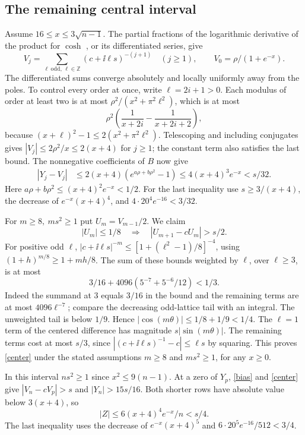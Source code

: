 \subsection{The remaining central interval}
Assume \(16\le x\le3\sqrt{n-1}\). The partial fractions of the logarithmic derivative of the product for \(\cosh\) \cite{dlmf}, or its differentiated series, give
\[
 V_j=\sum_{\ell\ \mathrm{odd},\,\ell\in\mathbb Z}(c+\ii\ell s)^{-(j+1)}
 \quad (j\ge1),\qquad V_0=\rho/(1+e^{-x}).
\]
The differentiated sums converge absolutely and locally uniformly away from the poles. To control every order at once, write \(\ell=2i+1>0\). Each modulus of order at least two is at most \(\rho^2/(x^2+\pi^2\ell^2)\), which is at most
\[
 \rho^2\left(\frac1{x+2i}-\frac1{x+2i+2}\right),
\]
because \((x+\ell)^2-1\le2(x^2+\pi^2\ell^2)\). Telescoping and including conjugates gives \(|V_j|\le2\rho^2/x\le2(x+4)\) for \(j\ge1\); the constant term also satisfies the last bound. The nonnegative coefficients of \(B\) now give
\begin{align}
 |Y_j-V_j|&\le2(x+4)(e^{a\rho+b\rho^2}-1)
 \le4(x+4)^3e^{-x}<s/32.\label{bias}
\end{align}
Here \(a\rho+b\rho^2\le (x+4)^2e^{-x}<1/2\). For the last inequality use \(s\ge3/(x+4)\), the decrease of \(e^{-x}(x+4)^4\), and \(4\cdot20^4e^{-16}<3/32\).

For \(m\ge8,\ ms^2\ge1\) put \(U_m=V_{m-1}/2\). We claim
\begin{equation}\label{center}
 |U_m|\le1/8\quad\Longrightarrow\quad |U_{m+1}-cU_m|>s/2 .
\end{equation}
For positive odd \(\ell\), \(|c+\ii\ell s|^{-m}\le[1+(\ell^2-1)/8]^{-4}\), using \((1+h)^{m/8}\ge1+mh/8\). The sum of these bounds weighted by \(\ell\), over \(\ell\ge3\), is at most
\[
 3/16+4096(5^{-7}+5^{-6}/12)<1/3.
\]
Indeed the summand at 3 equals \(3/16\) in the bound and the remaining terms are at most \(4096\ell^{-7}\); compare the decreasing odd-lattice tail with an integral. The unweighted tail is below \(1/9\). Hence \(|\cos(m\theta)|\le1/8+1/9<1/4\). The \(\ell=1\) term of the centered difference has magnitude \(s|\sin(m\theta)|\). The remaining terms cost at most \(s/3\), since \(|(c+\ii\ell s)^{-1}-c|\le\ell s\) by squaring. This proves \eqref{center} under the stated assumptions \(m\ge8\) and \(ms^2\ge1\), for any \(x\ge0\).

In this interval \(ns^2\ge1\) since \(x^2\le9(n-1)\). At a zero of \(Y_p\), \eqref{bias} and \eqref{center} give \(|V_n-cV_p|>s\) and \(|Y_n|>15s/16\). Both shorter rows have absolute value below \(3(x+4)\), so
\[
 |Z|\le 6(x+4)^4e^{-x}/n<s/4.
\]
The last inequality uses the decrease of \(e^{-x}(x+4)^5\) and \(6\cdot 20^5e^{-16}/512<3/4\).


